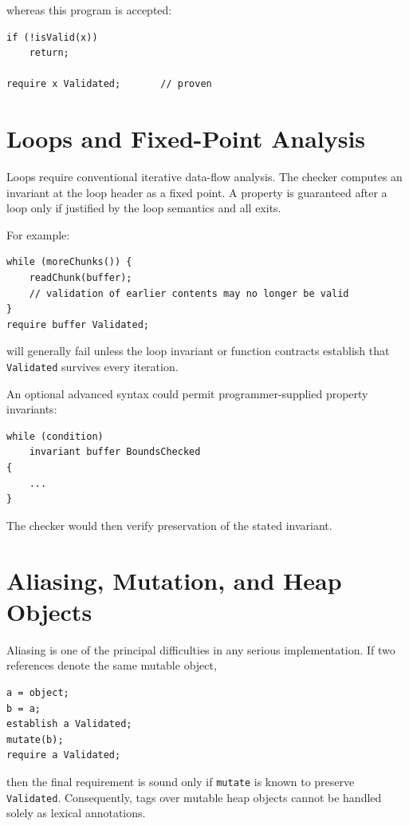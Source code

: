 \documentclass[11pt]{article}
\begin{document}
whereas this program is accepted:

\begin{lstlisting}
if (!isValid(x))
    return;

require x Validated;       // proven
\end{lstlisting}

\section{Loops and Fixed-Point Analysis}
Loops require conventional iterative data-flow analysis. The checker computes an invariant at the loop header as a fixed point. A property is guaranteed after a loop only if justified by the loop semantics and all exits.

For example:

\begin{lstlisting}
while (moreChunks()) {
    readChunk(buffer);
    // validation of earlier contents may no longer be valid
}
require buffer Validated;
\end{lstlisting}

will generally fail unless the loop invariant or function contracts establish that \texttt{Validated} survives every iteration.

An optional advanced syntax could permit programmer-supplied property invariants:

\begin{lstlisting}
while (condition)
    invariant buffer BoundsChecked
{
    ...
}
\end{lstlisting}

The checker would then verify preservation of the stated invariant.

\section{Aliasing, Mutation, and Heap Objects}
Aliasing is one of the principal difficulties in any serious implementation. If two references denote the same mutable object,

\begin{lstlisting}
a = object;
b = a;
establish a Validated;
mutate(b);
require a Validated;
\end{lstlisting}

then the final requirement is sound only if \texttt{mutate} is known to preserve \texttt{Validated}. Consequently, tags over mutable heap objects cannot be handled solely as lexical annotations.
\end{document}
